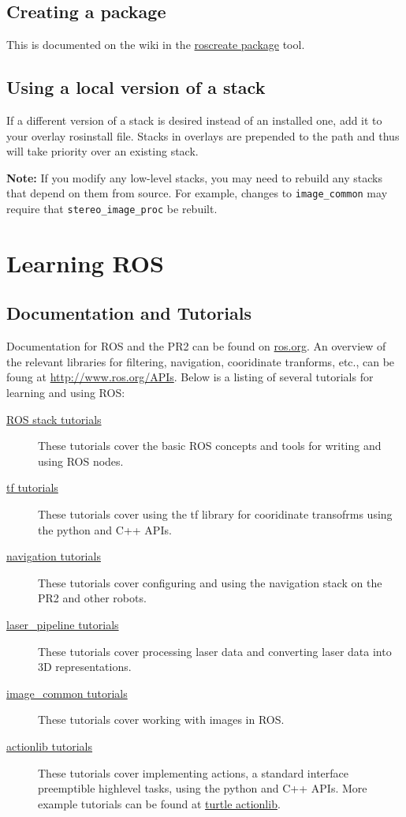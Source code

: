 \subsection{Creating a package}
This is documented on the wiki in the
\href{http://www.ros.org/wiki/roscreate}{roscreate package} tool.

\subsection{Using a local version of a stack}
If a different version of a stack is desired instead of an installed
one, add it to your overlay rosinstall file.  Stacks in overlays are
prepended to the path and thus will take priority over an existing
stack.  

{\bf Note:} If you modify any low-level stacks, you may need to rebuild any stacks that depend on them from source. For example, changes to \texttt{image\_common} may require that \texttt{stereo\_image\_proc} be rebuilt.

\section{Learning ROS}
\subsection{Documentation and Tutorials}
Documentation for ROS and the PR2 can be found on \href{http://www.ros.org}{ros.org}. An overview 
of the relevant libraries for filtering, navigation, cooridinate tranforms, etc., can be foung at 
\href{http://www.ros.org/APIs}{http://www.ros.org/APIs}. Below is a listing of several tutorials 
for learning and using ROS:
\begin{description}
\item[\href{http://www.ros.org/wiki/ROS/Tutorials}{ROS stack tutorials}] These tutorials cover the
basic ROS concepts and tools for writing and using ROS nodes.
\item[\href{http://www.ros.org/wiki/tf/Tutorials}{tf tutorials}] These tutorials cover using the tf 
library for cooridinate transofrms using the python and C++ APIs.
\item[\href{http://www.ros.org/wiki/navigation/Tutorials}{navigation tutorials}] These tutorials 
cover configuring and using the navigation stack on the PR2 and other robots.
\item[\href{http://www.ros.org/wiki/laser\_pipeline/Tutorials}{laser\_pipeline tutorials}] These tutorials 
cover processing laser data and converting laser data into 3D representations.
\item[\href{http://www.ros.org/wiki/image\_common/Tutorials}{image\_common tutorials}] These tutorials 
cover working with images in ROS.
\item[\href{http://www.ros.org/wiki/actionlib\_tutorials/Tutorials}{actionlib tutorials}] These 
tutorials cover implementing actions, a standard interface preemptible highlevel tasks, using 
the python and C++ APIs. More example tutorials can be found at 
\href{http://www.ros.org/wiki/turtle\_actionlib}{turtle actionlib}.
\end{description}

